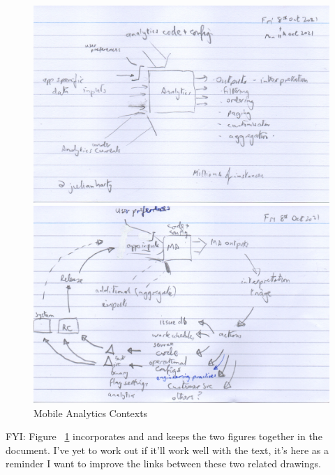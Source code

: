 \begin{figure}
\RawFloats
\centering
\begin{minipage}{.70\textwidth}
  \centering
  \includegraphics[width=\linewidth]{images/rough-sketches/outputs_from_inputs_code_config-11-oct-2021.jpeg}
\end{minipage}\hfill%
\begin{minipage}{.70\textwidth}
  \centering
  \includegraphics[width=\linewidth]{images/rough-sketches/analytics-feedback-cycle-11-oct-2021.jpeg}
\end{minipage}
    \caption{Mobile Analytics Contexts}
    \label{fig:mobile-analytics-contexts}
\end{figure}


FYI: Figure ~\ref{fig:mobile-analytics-contexts} incorporates  and  and keeps the two figures together in the document. I've yet to work out if it'll work well with the text, it's here as a reminder I want to improve the links between these two related drawings.



